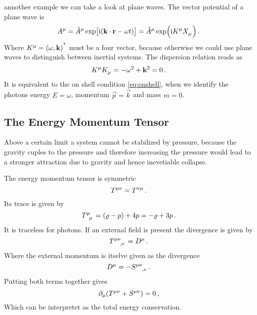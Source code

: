 annother example we can take a look at plane waves. The vector potential of a plane wave is
\begin{equation}
    \tensor{A}{^\mu}=\tensor{\hat{A}}{^\mu}
    \exp\left[\imI(\vec{k}\cdot\vec{r}-\omega
    t)\right]
    =\tensor{\hat{A}}{^\mu}\exp\left(\imI\tensor{K}{^\mu} \tensor{X}{_\mu}\right)\,
    .
\end{equation}
Where $\tensor{K}{^\mu}=\left(\omega,\vec{k}\right)\transpose$ must be a four
vector, because otherwise we could use plane waves to distinguish between
inertial systems. The dispersion relation reads as
\begin{equation}
    \tensor{K}{^\mu}\tensor{K}{_\mu}=-\omega^2+\vec{k}^2=0\, .
\end{equation}
It is equivalent to the on shell condition \eqref{eq:onshell}, when we identify
the photons energy $E=\omega$, momentum $\vec{p}=\vec{k}$ and mass $m=0$.
\subsection{The Energy Momentum Tensor}
\begin{sidenote}
Above a certain limit a system cannot be stabilized by pressure, because the
gravity cuples to the pressure and therefore increasing the pressure would lead
to a stronger attraction due to gravity and hence inevetiable collapse.
\end{sidenote}
The energy momentum tensor is symmetric
\begin{equation}
    \tensor{T}{^\mu^\nu}=\tensor{T}{^\nu^\mu}\, .
\end{equation}
Its trace is given by
\begin{equation}
    \tensor{T}{^\mu_\mu}=(\varrho-p)+4p=-\varrho+3p\, .
\end{equation}
It is traceless for photons. If an external field is present the divergence is
given by
\begin{equation}
    \tensor{T}{^\mu^\nu_,_\nu}=\tensor{D}{^\mu}\,  .
\end{equation}
Where the external momentum is itselve given as the divergence
\begin{equation}
    \tensor{D}{^\mu} =-\tensor{S}{^\mu^\nu_,_\nu}\, .
\end{equation}
Putting both terms together gives
\begin{equation}
    \partial_\mu(\tensor{T}{^\mu^\nu}+\tensor{S}{^\mu^\nu})=0\,,
\end{equation}
Which can be interpretet as the total energy conservation.
